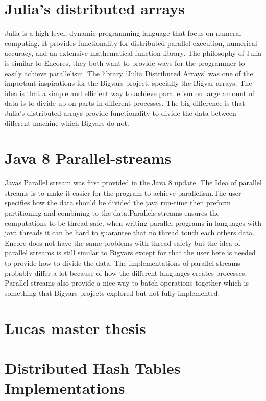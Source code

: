 \section{Julia's distributed arrays}
Julia is a high-level, dynamic programming language that focus on numeral computing. It provides functionality for distributed parallel execution, numerical accuracy, and an extensive mathematical function library\cite{julia}. The philosophy of Julia is similar to Encores, they both want to provide ways for the programmer to easily achieve parallelism. The library ‘Julia Distributed Arrays’\cite{distarrays} was one of the important inspirations for the Bigvars project, specially the Bigvar arrays. The idea is that a simple and efficient way to achieve parallelism on large amount of data is to divide up on parts in different processes. The big difference is that Julia’s distributed arrays provide functionality to divide the data between different machine which Bigvars do not. 
\section{Java 8 Parallel-streams}
Javas Parallel stream was first provided in the Java 8 update. The Idea of parallel streams is to make it easier for the program to achieve parallelism.The user specifies how the data should be divided the java run-time then preform partitioning and combining to the data.\cite{pstreams}Parallels streams ensures the computations to be thread safe, when writing parallel programs in languages with java threads it can be hard to guarantee that no thread touch each others data. Encore does not have the same problems with thread safety but the idea of parallel streams is still similar to Bigvars except for that the user here is needed to provide how to divide the data. The implementations of parallel streams probably differ a lot because of how the different languages creates processes. Parallel streams also provide a nice way to batch operations together which is something that Bigvars projects explored but not fully implemented. 

\section{Lucas master thesis}

\section{Distributed Hash Tables Implementations}

